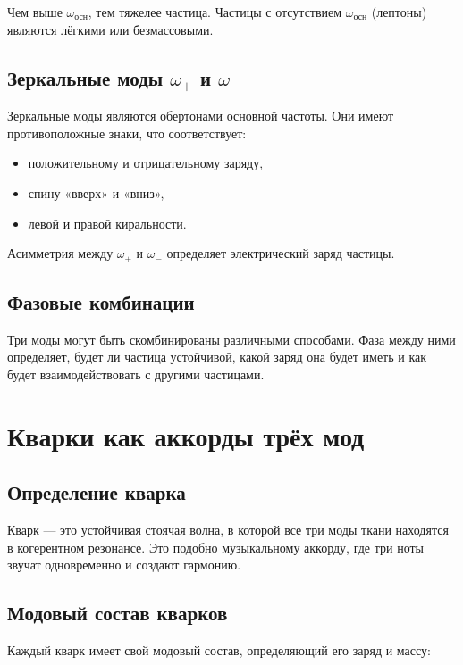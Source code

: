 \documentclass[12pt,a4paper]{article}
\begin{document}
Чем выше \(\omega_{\text{осн}}\), тем тяжелее частица. Частицы с отсутствием \(\omega_{\text{осн}}\) (лептоны) являются лёгкими или безмассовыми.

\subsection{Зеркальные моды \( \omega_{+} \) и \( \omega_{-} \)}

Зеркальные моды являются обертонами основной частоты. Они имеют противоположные знаки, что соответствует:
\begin{itemize}
\item положительному и отрицательному заряду,
\item спину «вверх» и «вниз»,
\item левой и правой киральности.
\end{itemize}

Асимметрия между \(\omega_{+}\) и \(\omega_{-}\) определяет электрический заряд частицы.

\subsection{Фазовые комбинации}

Три моды могут быть скомбинированы различными способами. Фаза между ними определяет, будет ли частица устойчивой, какой заряд она будет иметь и как будет взаимодействовать с другими частицами.

\section{Кварки как аккорды трёх мод}

\subsection{Определение кварка}

Кварк — это устойчивая стоячая волна, в которой все три моды ткани находятся в когерентном резонансе. Это подобно музыкальному аккорду, где три ноты звучат одновременно и создают гармонию.

\subsection{Модовый состав кварков}

Каждый кварк имеет свой модовый состав, определяющий его заряд и массу:
\end{document}
